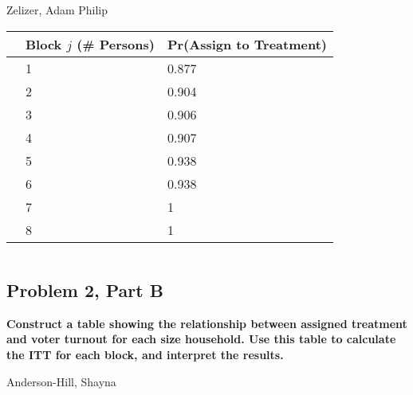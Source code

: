 \documentclass[11pt,notitlepage]{article}
\begin{document}
\begin{table}[h!]
\begin{center}
\begin{minipage}[t]{0.45\linewidth}\centering

Zelizer, Adam Philip

\begin{tabular}{rll}
  \hline
 & Block $j$ (\# Persons) & Pr(Assign to Treatment) \\ 
  \hline
   & 1 & 0.877 \\ 
   & 2 & 0.904 \\ 
   & 3 & 0.906 \\ 
   & 4 & 0.907 \\ 
   & 5 & 0.938 \\ 
   & 6 & 0.938 \\ 
   & 7 & 1 \\ 
   & 8 & 1 \\ 
   \hline
\end{tabular}

\end{minipage}
\hspace{0.5cm}
\begin{minipage}[t]{0.45\linewidth}\centering

$\;$

\end{minipage}

\end{center}
\end{table}

\clearpage


\subsection{Problem 2, Part B} {\bf Construct a table showing the relationship between assigned treatment and voter turnout for each size household.  Use this table to calculate the ITT for each block, and interpret the results.}

\vspace{1cm}





Anderson-Hill, Shayna
\end{document}
